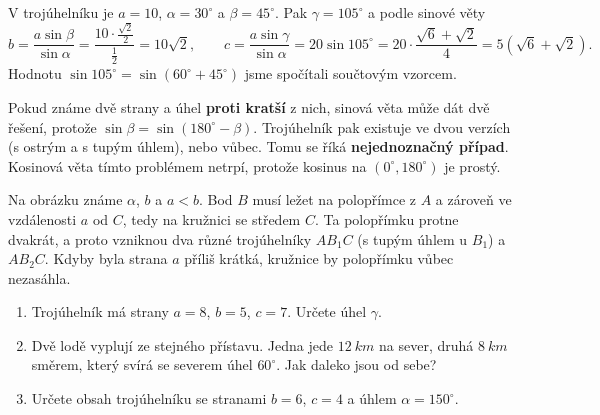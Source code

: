 \begin{example}
  V trojúhelníku je $a = 10$, $\alpha = 30^\circ$ a $\beta = 45^\circ$. Pak $\gamma = 105^\circ$ a podle sinové věty
  \begin{equation*}
    b = \frac{a\sin\beta}{\sin\alpha} = \frac{10\cdot\frac{\sqrt{2}}{2}}{\frac{1}{2}} = 10\sqrt{2},\qquad c = \frac{a\sin\gamma}{\sin\alpha} = 20\sin 105^\circ = 20\cdot\frac{\sqrt{6} + \sqrt{2}}{4} = 5(\sqrt{6} + \sqrt{2}).
  \end{equation*}
  Hodnotu $\sin 105^\circ = \sin(60^\circ + 45^\circ)$ jsme spočítali součtovým vzorcem.
\end{example}

\begin{note}
  Pokud známe dvě strany a úhel \textbf{proti kratší} z nich, sinová věta může dát dvě řešení, protože $\sin\beta = \sin(180^\circ - \beta)$. Trojúhelník pak existuje ve dvou verzích (s ostrým a s tupým úhlem), nebo vůbec. Tomu se říká \textbf{nejednoznačný případ}. Kosinová věta tímto problémem netrpí, protože kosinus na $(0^\circ, 180^\circ)$ je prostý.
\end{note}

\begin{center}
\end{center}
Na obrázku známe $\alpha$, $b$ a $a < b$. Bod $B$ musí ležet na polopřímce z $A$ a zároveň ve vzdálenosti $a$ od $C$, tedy na kružnici se středem $C$. Ta polopřímku protne dvakrát, a proto vzniknou dva různé trojúhelníky $AB_1C$ (s tupým úhlem u $B_1$) a $AB_2C$. Kdyby byla strana $a$ příliš krátká, kružnice by polopřímku vůbec nezasáhla.

\begin{problem}
  \begin{enumerate}[label=(\alph*)]
    \item Trojúhelník má strany $a = 8$, $b = 5$, $c = 7$. Určete úhel $\gamma$.
    \item Dvě lodě vyplují ze stejného přístavu. Jedna jede $12\ \si{km}$ na sever, druhá $8\ \si{km}$ směrem, který svírá se severem úhel $60^\circ$. Jak daleko jsou od sebe?
    \item Určete obsah trojúhelníku se stranami $b = 6$, $c = 4$ a úhlem $\alpha = 150^\circ$.
  \end{enumerate}
\end{problem}

